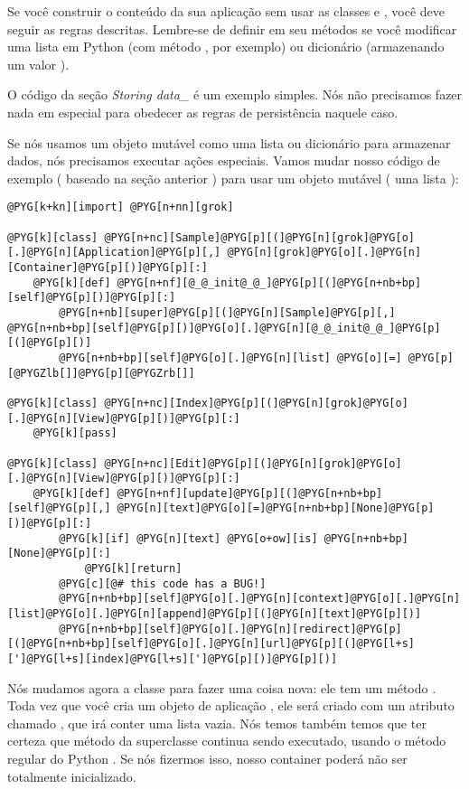 \documentclass[a4paper,12pt,portuguese]{manual}
\begin{document}
Se você construir o conteúdo da sua aplicação sem usar as classes
 e , você deve seguir as regras
descritas. Lembre-se de definir  em seu métodos se você
modificar uma lista em Python (com método , por exemplo) ou
dicionário (armazenando um valor ).

O código da seção \emph{Storing data\_} é um exemplo simples. Nós não
precisamos fazer nada em especial para obedecer as regras de
persistência naquele caso.

Se nós usamos um objeto mutável como uma lista ou dicionário para
armazenar dados, nós precisamos executar ações especiais. Vamos mudar
nosso código de exemplo ( baseado na seção anterior ) para usar um
objeto mutável ( uma lista ):

\begin{Verbatim}[commandchars=@\[\]]
@PYG[k+kn][import] @PYG[n+nn][grok]

@PYG[k][class] @PYG[n+nc][Sample]@PYG[p][(]@PYG[n][grok]@PYG[o][.]@PYG[n][Application]@PYG[p][,] @PYG[n][grok]@PYG[o][.]@PYG[n][Container]@PYG[p][)]@PYG[p][:]
    @PYG[k][def] @PYG[n+nf][@_@_init@_@_]@PYG[p][(]@PYG[n+nb+bp][self]@PYG[p][)]@PYG[p][:]
        @PYG[n+nb][super]@PYG[p][(]@PYG[n][Sample]@PYG[p][,] @PYG[n+nb+bp][self]@PYG[p][)]@PYG[o][.]@PYG[n][@_@_init@_@_]@PYG[p][(]@PYG[p][)]
        @PYG[n+nb+bp][self]@PYG[o][.]@PYG[n][list] @PYG[o][=] @PYG[p][@PYGZlb[]]@PYG[p][@PYGZrb[]]
    
@PYG[k][class] @PYG[n+nc][Index]@PYG[p][(]@PYG[n][grok]@PYG[o][.]@PYG[n][View]@PYG[p][)]@PYG[p][:]
    @PYG[k][pass]

@PYG[k][class] @PYG[n+nc][Edit]@PYG[p][(]@PYG[n][grok]@PYG[o][.]@PYG[n][View]@PYG[p][)]@PYG[p][:]
    @PYG[k][def] @PYG[n+nf][update]@PYG[p][(]@PYG[n+nb+bp][self]@PYG[p][,] @PYG[n][text]@PYG[o][=]@PYG[n+nb+bp][None]@PYG[p][)]@PYG[p][:]
        @PYG[k][if] @PYG[n][text] @PYG[o+ow][is] @PYG[n+nb+bp][None]@PYG[p][:]
            @PYG[k][return]
        @PYG[c][@# this code has a BUG!]
        @PYG[n+nb+bp][self]@PYG[o][.]@PYG[n][context]@PYG[o][.]@PYG[n][list]@PYG[o][.]@PYG[n][append]@PYG[p][(]@PYG[n][text]@PYG[p][)]
        @PYG[n+nb+bp][self]@PYG[o][.]@PYG[n][redirect]@PYG[p][(]@PYG[n+nb+bp][self]@PYG[o][.]@PYG[n][url]@PYG[p][(]@PYG[l+s][']@PYG[l+s][index]@PYG[l+s][']@PYG[p][)]@PYG[p][)]
\end{Verbatim}

Nós mudamos agora a classe  para fazer uma coisa nova: ele
tem um método . Toda vez que você cria um objeto de
aplicação , ele será criado com um atributo chamado
, que irá conter uma lista vazia.
Nós temos também temos que ter certeza que método  da
superclasse continua sendo executado, usando o método regular do
Python . Se nós fizermos isso, nosso container poderá não ser
totalmente inicializado.
\end{document}
